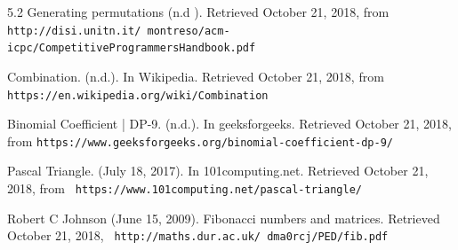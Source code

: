 \documentclass[12pt]{article}
\begin{document}
\begin{thebibliography}{9}
5.2 Generating permutations (n.d ). Retrieved October 21, 2018, from \texttt{ http://disi.unitn.it/~montreso/acm-icpc/CompetitiveProgrammersHandbook.pdf }

Combination. (n.d.). In Wikipedia. Retrieved October 21, 2018, from \texttt{https://en.wikipedia.org/wiki/Combination}

Binomial Coefficient | DP-9. (n.d.). In geeksforgeeks. Retrieved October 21, 2018, from \texttt{https://www.geeksforgeeks.org/binomial-coefficient-dp-9/}



Pascal Triangle. (July 18, 2017). In 101computing.net. Retrieved October 21, 2018, from \texttt{ https://www.101computing.net/pascal-triangle/ }

Robert C Johnson (June 15, 2009). Fibonacci numbers and matrices. Retrieved October 21, 2018,  \texttt{ http://maths.dur.ac.uk/~dma0rcj/PED/fib.pdf}










\end{thebibliography}
\end{document}
